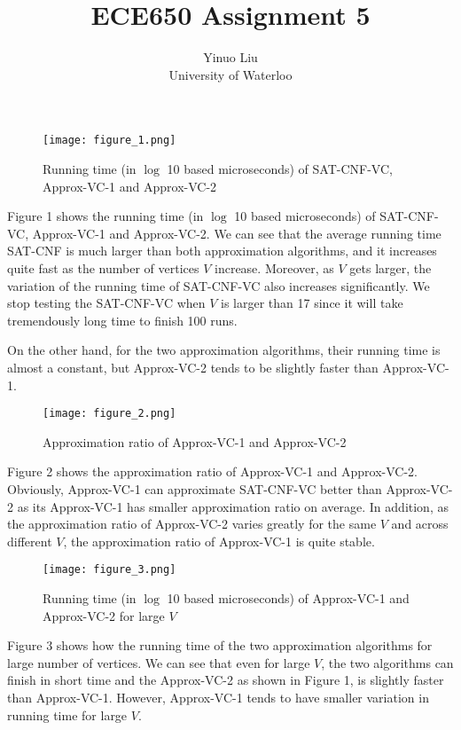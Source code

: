 \documentclass[letterpaper,12pt,titlepage,oneside,final]{book}
\title{ECE650 Assignment 5}
\author{Yinuo Liu\\ University of Waterloo}
\begin{document}
\maketitle
\begin{figure}[h!]
    \centering
    \texttt{[image: figure\_1.png]}
    \caption{Running time (in $\log$ 10 based microseconds) of SAT-CNF-VC, Approx-VC-1 and Approx-VC-2}
\end{figure}

Figure 1 shows the running time (in $\log$ 10 based microseconds) of SAT-CNF-VC, Approx-VC-1 and Approx-VC-2. We can see that the average running time SAT-CNF is much larger than both approximation algorithms, and it increases quite fast as the number of vertices $V$ increase. Moreover, as $V$ gets larger, the variation of the running time of SAT-CNF-VC also increases significantly. We stop testing the SAT-CNF-VC when $V$ is larger than 17 since it will take tremendously long time to finish 100 runs.

On the other hand, for the two approximation algorithms, their running time is almost a constant, but Approx-VC-2 tends to be slightly faster than Approx-VC-1. 


\begin{figure}[h!]
    \centering
    \texttt{[image: figure\_2.png]}
    \caption{Approximation ratio of Approx-VC-1 and Approx-VC-2}
\end{figure}

Figure 2 shows the approximation ratio of Approx-VC-1 and Approx-VC-2. Obviously, Approx-VC-1 can approximate SAT-CNF-VC better than Approx-VC-2 as its Approx-VC-1 has smaller approximation ratio on average. In addition, as the approximation ratio of Approx-VC-2 varies greatly for the same $V$ and across different $V$, the approximation ratio of Approx-VC-1 is quite stable.



\begin{figure}[h!]
    \centering
    \texttt{[image: figure\_3.png]}
    \caption{Running time (in $\log$ 10 based microseconds) of Approx-VC-1 and Approx-VC-2 for large $V$}
\end{figure}

Figure 3 shows how the running time of the two approximation algorithms for large number of vertices. We can see that even for large $V$, the two algorithms can finish in short time and the Approx-VC-2 as shown in Figure 1, is slightly faster than Approx-VC-1. However, Approx-VC-1 tends to have smaller variation in running time for large $V$. 
\end{document}
